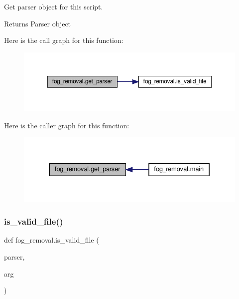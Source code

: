 Get parser object for this script. 

\begin{DoxyReturn}{Returns}
Parser object 
\end{DoxyReturn}
Here is the call graph for this function\+:\nopagebreak
\begin{figure}[H]
\begin{center}
\leavevmode
\includegraphics[width=350pt]{namespacefog__removal_a89c98f8f9a6d048485938fc05675ce9e_cgraph}
\end{center}
\end{figure}
Here is the caller graph for this function\+:\nopagebreak
\begin{figure}[H]
\begin{center}
\leavevmode
\includegraphics[width=329pt]{namespacefog__removal_a89c98f8f9a6d048485938fc05675ce9e_icgraph}
\end{center}
\end{figure}
\mbox{\label{namespacefog__removal_a7b07384f6a6ff8498e14f3aa5f8e2252}} 
\subsubsection{\texorpdfstring{is\+\_\+valid\+\_\+file()}{is\_valid\_file()}}
{\footnotesize\ttfamily def fog\+\_\+removal.\+is\+\_\+valid\+\_\+file (\begin{DoxyParamCaption}\item[{}]{parser,  }\item[{}]{arg }\end{DoxyParamCaption})}



